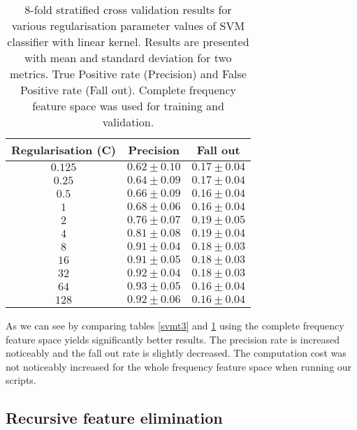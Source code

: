 \documentclass[reqno,openany,12pt]{amsbook}
\begin{document}
\begin{table}
\begin{tabular}{|c|c|c|}
\hline
Regularisation (C) &  Precision & Fall out \\ \hline 
$0.125$ &  $0.62 \pm 0.10$ & $0.17 \pm 0.04$ \\ \hline 
$0.25$ &  $0.64 \pm 0.09$ & $0.17 \pm 0.04$ \\ \hline 
$0.5$ &  $0.66 \pm 0.09$ & $0.16 \pm 0.04$ \\ \hline 
$1$ &  $0.68 \pm 0.06$ & $0.16 \pm 0.04$ \\ \hline 
$2$ &  $0.76 \pm 0.07$ & $0.19 \pm 0.05$ \\ \hline 
$4$ &  $0.81 \pm 0.08$ & $0.19 \pm 0.04$ \\ \hline 
$8$ &  $0.91 \pm 0.04$ & $0.18 \pm 0.03$ \\ \hline 
$16$ &  $0.91 \pm 0.05$ & $0.18 \pm 0.03$ \\ \hline 
$32$ &  $0.92 \pm 0.04$ & $0.18 \pm 0.03$ \\ \hline
$64$ &  $0.93 \pm 0.05$ & $0.16 \pm 0.04$ \\ \hline
$128$ &  $0.92 \pm 0.06$ & $0.16 \pm 0.04$ \\ \hline
\end{tabular}
\vspace{5pt}
\caption{8-fold stratified cross validation results for various regularisation parameter values of SVM classifier with linear kernel. Results are presented with mean and standard deviation for two metrics. True Positive rate (Precision) and False Positive rate (Fall out). Complete frequency feature space was used for training and validation.}
\label{svmt4}
\end{table}

As we can see by comparing tables \ref{svmt3} and \ref{svmt4} using the complete frequency feature space yields significantly better results. The precision rate is increased noticeably and the fall out rate is slightly decreased. The computation cost was not noticeably increased for the whole frequency feature space when running our scripts.

\subsection{Recursive feature elimination}\mbox{}
\end{document}
